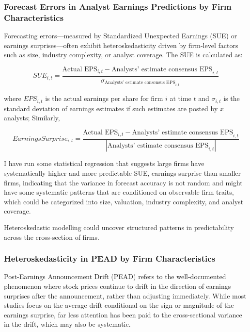 \subsubsection*{Forecast Errors in Analyst Earnings Predictions by Firm Characteristics}
Forecasting errors—measured by Standardized Unexpected Earnings (SUE) or earnings surprises—often exhibit heteroskedasticity driven by firm-level factors such as size, industry complexity, or analyst coverage. The SUE is calculated as:

\begin{equation}
SUE_{i,t} = \frac{\text{Actual EPS}_{i,t} - \text{Analysts' estimate consensus EPS}_{i,t}}{\sigma_{\text{Analysts' estimate consensus EPS}_{i,t}}}
\end{equation}

where $EPS_{i,t}$ is the actual earnings per share for firm $i$ at time $t$ and $\sigma_{i,t}$ is the standard deviation of earnings estimates if such estimates are posted by $x$ analysts; Similarly, 

\begin{equation}
Earnings Surprise_{i,t} = \frac{\text{Actual EPS}_{i,t} - \text{Analysts' estimate consensus EPS}_{i,t}}{|\text{Analysts' estimate consensus EPS}_{i,t}|}
\end{equation}

I have run some statistical regression that suggests large firms have systematically higher and more predictable SUE, earnings surprise than smaller firms, indicating that the variance in forecast accuracy is not random and might have some systematic patterns that are conditioned on observable firm traits, which could be categorized into size, valuation, industry complexity, and analyst coverage. 

Heteroskedastic modelling could uncover structured patterns in predictability across the cross-section of firms.


\subsubsection*{Heteroskedasticity in PEAD by Firm Characteristics}

Post-Earnings Announcement Drift (PEAD) refers to the well-documented phenomenon where stock prices continue to drift in the direction of earnings surprises after the announcement, rather than adjusting immediately. While most studies focus on the average drift conditional on the sign or magnitude of the earnings surprise, far less attention has been paid to the cross-sectional variance in the drift, which may also be systematic.

